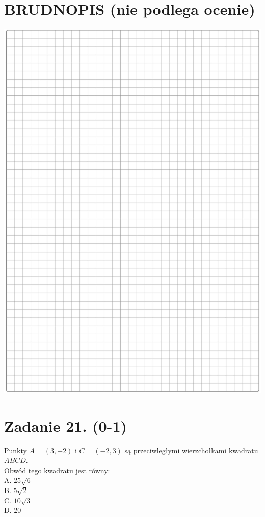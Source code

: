 \documentclass[10pt]{article}
\begin{document}
\section*{BRUDNOPIS (nie podlega ocenie)}
\begin{center}
\includegraphics[max width=\textwidth]{2024_11_21_cdea326d19d0c2132b88g-07}
\end{center}

\section*{Zadanie 21. (0-1)}
Punkty \(A=(3,-2)\) i \(C=(-2,3)\) są przeciwległymi wierzchołkami kwadratu \(A B C D\).\\
Obwód tego kwadratu jest równy:\\
A. \(25 \sqrt{6}\)\\
B. \(5 \sqrt{2}\)\\
C. \(10 \sqrt{3}\)\\
D. 20
\end{document}
